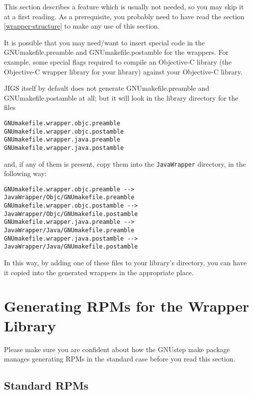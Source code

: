 This section describes a feature which is usually not needed, so you
may skip it at a first reading.  As a prerequisite, you probably need
to have read the section \ref{wrapper-structure} to make any use of
this section.

It is possible that you may need/want to insert special code in the
GNUmakefile.preamble and GNUmakefile.postamble for the wrappers.  For
example, some special flags required to compile an Objective-C library
(the Objective-C wrapper library for your library) against your
Objective-C library.

JIGS itself by default does not generate GNUmakefile.preamble and
GNUmakefile.postamble at all; but it will look in the library
directory for the files 
\begin{verbatim}
GNUmakefile.wrapper.objc.preamble
GNUmakefile.wrapper.objc.postamble
GNUmakefile.wrapper.java.preamble
GNUmakefile.wrapper.java.postamble
\end{verbatim}
and, if any of them is present, copy them into the \texttt{JavaWrapper} 
directory, in the following way:
\begin{verbatim}
GNUmakefile.wrapper.objc.preamble --> JavaWrapper/Objc/GNUmakefile.preamble
GNUmakefile.wrapper.objc.postamble --> JavaWrapper/Objc/GNUmakefile.postamble
GNUmakefile.wrapper.java.preamble --> JavaWrapper/Java/GNUmakefile.preamble
GNUmakefile.wrapper.java.postamble --> JavaWrapper/Java/GNUmakefile.postamble
\end{verbatim}

In this way, by adding one of these files to your library's directory,
you can have it copied into the generated wrappers in the appropriate
place.

\section{Generating RPMs for the Wrapper Library}

Please make sure you are confident about how the GNUstep make package
manages generating RPMs in the standard case before you read this
section.

\subsection{Standard RPMs}

